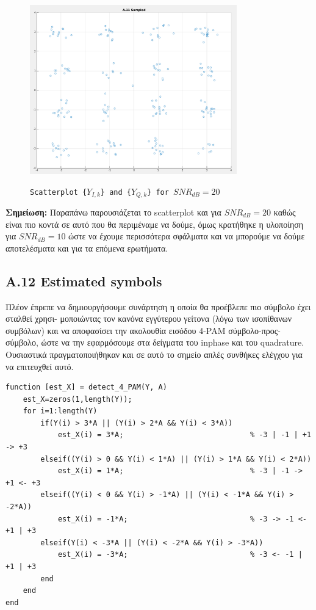 \documentclass[11pt]{article}
\begin{document}
    \begin{figure}[H]
        \centering
        \includegraphics[scale=0.5, width=0.8\textwidth]{img/A11_SNR_20.png} \\
        \caption{\texttt{Scatterplot \{$Y_{I,k}$\} and \{$Y_{Q,k}$\} for $SNR_{dB}=20$}}
    \end{figure}
    
    \par \noindent
    \textbf{Σημείωση:} Παραπάνω παρουσιάζεται το scatterplot και για $SNR_{dB}=20$ καθώς είναι πιο κοντά σε αυτό που θα περιμέναμε να δούμε, όμως κρατήθηκε η υλοποίηση για $SNR_{dB}=10$ ώστε να έχουμε περισσότερα σφάλματα και να μπορούμε να δούμε αποτελέσματα και για τα επόμενα ερωτήματα. 
    
    \subsection*{A.12 Estimated symbols}
    Πλέον έπρεπε να δημιουργήσουμε συνάρτηση η οποία θα προέβλεπε πιο σύμβολο έχει σταλθεί χρησι- μοποιώντας τον κανόνα εγγύτερου γείτονα (λόγω των ισοπίθανων συμβόλων) και να αποφασίσει την ακολουθία εισόδου 4-PAM σύμβολο-προς-σύμβολο, ώστε να την εφαρμόσουμε στα δείγματα του inphase και του quadrature.
    Ουσιαστικά πραγματοποιήθηκαν και σε αυτό το σημείο απλές συνθήκες ελέγχου για να επιτευχθεί αυτό.
    
    \begin{lstlisting}[caption = {\texttt{detect\_4\_PAM()}}]
function [est_X] = detect_4_PAM(Y, A)
    est_X=zeros(1,length(Y));
    for i=1:length(Y)
        if(Y(i) > 3*A || (Y(i) > 2*A && Y(i) < 3*A))                        
            est_X(i) = 3*A;                             % -3 | -1 | +1 -> +3
        elseif((Y(i) > 0 && Y(i) < 1*A) || (Y(i) > 1*A && Y(i) < 2*A))      
            est_X(i) = 1*A;                             % -3 | -1 -> +1 <- +3
        elseif((Y(i) < 0 && Y(i) > -1*A) || (Y(i) < -1*A && Y(i) > -2*A))   
            est_X(i) = -1*A;                            % -3 -> -1 <- +1 | +3
        elseif(Y(i) < -3*A || (Y(i) < -2*A && Y(i) > -3*A))                 
            est_X(i) = -3*A;                            % -3 <- -1 | +1 | +3
        end
    end
end
    \end{lstlisting}
    
\end{document}
